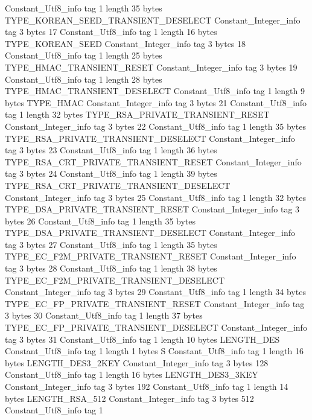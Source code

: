 {{{		}
		Constant_Utf8_info {
			tag	1
			length	35
			bytes	TYPE_KOREAN_SEED_TRANSIENT_DESELECT
		}
		Constant_Integer_info {
			tag	3
			bytes	17
		}
		Constant_Utf8_info {
			tag	1
			length	16
			bytes	TYPE_KOREAN_SEED
		}
		Constant_Integer_info {
			tag	3
			bytes	18
		}
		Constant_Utf8_info {
			tag	1
			length	25
			bytes	TYPE_HMAC_TRANSIENT_RESET
		}
		Constant_Integer_info {
			tag	3
			bytes	19
		}
		Constant_Utf8_info {
			tag	1
			length	28
			bytes	TYPE_HMAC_TRANSIENT_DESELECT
		}
		Constant_Utf8_info {
			tag	1
			length	9
			bytes	TYPE_HMAC
		}
		Constant_Integer_info {
			tag	3
			bytes	21
		}
		Constant_Utf8_info {
			tag	1
			length	32
			bytes	TYPE_RSA_PRIVATE_TRANSIENT_RESET
		}
		Constant_Integer_info {
			tag	3
			bytes	22
		}
		Constant_Utf8_info {
			tag	1
			length	35
			bytes	TYPE_RSA_PRIVATE_TRANSIENT_DESELECT
		}
		Constant_Integer_info {
			tag	3
			bytes	23
		}
		Constant_Utf8_info {
			tag	1
			length	36
			bytes	TYPE_RSA_CRT_PRIVATE_TRANSIENT_RESET
		}
		Constant_Integer_info {
			tag	3
			bytes	24
		}
		Constant_Utf8_info {
			tag	1
			length	39
			bytes	TYPE_RSA_CRT_PRIVATE_TRANSIENT_DESELECT
		}
		Constant_Integer_info {
			tag	3
			bytes	25
		}
		Constant_Utf8_info {
			tag	1
			length	32
			bytes	TYPE_DSA_PRIVATE_TRANSIENT_RESET
		}
		Constant_Integer_info {
			tag	3
			bytes	26
		}
		Constant_Utf8_info {
			tag	1
			length	35
			bytes	TYPE_DSA_PRIVATE_TRANSIENT_DESELECT
		}
		Constant_Integer_info {
			tag	3
			bytes	27
		}
		Constant_Utf8_info {
			tag	1
			length	35
			bytes	TYPE_EC_F2M_PRIVATE_TRANSIENT_RESET
		}
		Constant_Integer_info {
			tag	3
			bytes	28
		}
		Constant_Utf8_info {
			tag	1
			length	38
			bytes	TYPE_EC_F2M_PRIVATE_TRANSIENT_DESELECT
		}
		Constant_Integer_info {
			tag	3
			bytes	29
		}
		Constant_Utf8_info {
			tag	1
			length	34
			bytes	TYPE_EC_FP_PRIVATE_TRANSIENT_RESET
		}
		Constant_Integer_info {
			tag	3
			bytes	30
		}
		Constant_Utf8_info {
			tag	1
			length	37
			bytes	TYPE_EC_FP_PRIVATE_TRANSIENT_DESELECT
		}
		Constant_Integer_info {
			tag	3
			bytes	31
		}
		Constant_Utf8_info {
			tag	1
			length	10
			bytes	LENGTH_DES
		}
		Constant_Utf8_info {
			tag	1
			length	1
			bytes	S
		}
		Constant_Utf8_info {
			tag	1
			length	16
			bytes	LENGTH_DES3_2KEY
		}
		Constant_Integer_info {
			tag	3
			bytes	128
		}
		Constant_Utf8_info {
			tag	1
			length	16
			bytes	LENGTH_DES3_3KEY
		}
		Constant_Integer_info {
			tag	3
			bytes	192
		}
		Constant_Utf8_info {
			tag	1
			length	14
			bytes	LENGTH_RSA_512
		}
		Constant_Integer_info {
			tag	3
			bytes	512
		}
		Constant_Utf8_info {
			tag	1
}}}
